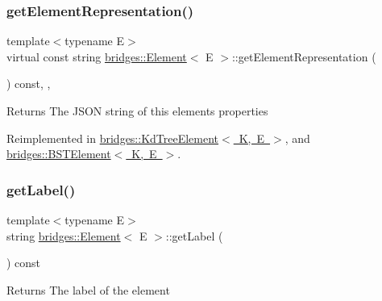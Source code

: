 \subsubsection{\texorpdfstring{get\+Element\+Representation()}{getElementRepresentation()}}
{\footnotesize\ttfamily template$<$typename E$>$ \\
virtual const string \mbox{\hyperlink{classbridges_1_1_element}{bridges\+::\+Element}}$<$ E $>$\+::get\+Element\+Representation (\begin{DoxyParamCaption}{ }\end{DoxyParamCaption}) const\hspace{0.3cm}{\ttfamily [inline]}, {\ttfamily [protected]}, {\ttfamily [virtual]}}

\begin{DoxyReturn}{Returns}
The J\+S\+ON string of this element\textquotesingle{}s properties 
\end{DoxyReturn}


Reimplemented in \mbox{\hyperlink{classbridges_1_1_kd_tree_element_ad8aa2d89689f33691063fee9c601e2cb}{bridges\+::\+Kd\+Tree\+Element$<$ K, E $>$}}, and \mbox{\hyperlink{classbridges_1_1_b_s_t_element_a623d1495a0d27090dc3fc515d148f381}{bridges\+::\+B\+S\+T\+Element$<$ K, E $>$}}.

\mbox{\label{classbridges_1_1_element_a38df6d5f1e0203dfa85b073b6756194e}} 
\subsubsection{\texorpdfstring{get\+Label()}{getLabel()}}
{\footnotesize\ttfamily template$<$typename E$>$ \\
string \mbox{\hyperlink{classbridges_1_1_element}{bridges\+::\+Element}}$<$ E $>$\+::get\+Label (\begin{DoxyParamCaption}{ }\end{DoxyParamCaption}) const\hspace{0.3cm}{\ttfamily [inline]}}

\begin{DoxyReturn}{Returns}
The label of the element 
\end{DoxyReturn}
\mbox{\label{classbridges_1_1_element_ac6fa7b04e28a1e9b8d8f2d395dd6e2c1}} 
